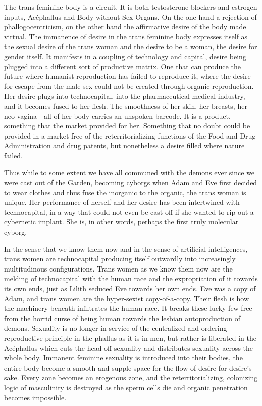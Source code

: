 \documentclass[10pt, statementpaper, twoside, openright]{memoir}
\begin{document}
The trans feminine body is a circuit. It is both testosterone blockers and estrogen inputs, Acéphallus and Body without Sex Organs. On the one hand a rejection of phallogocentricism, on the other hand the affirmative desire of the body made virtual. The immanence of desire in the trans feminine body expresses itself as the sexual desire of the trans woman and the desire to be a woman, the desire for gender itself. It manifests in a coupling of technology and capital, desire being plugged into a different sort of productive matrix. One that can produce the future where humanist reproduction has failed to reproduce it, where the desire for escape from the male sex could not be created through organic reproduction. Her desire plugs into technocapital, into the pharmaceutical-medical industry, and it becomes fused to her flesh. The smoothness of her skin, her breasts, her neo-vagina---all of her body carries an unspoken barcode. It is a product, something that the market provided for her. Something that no doubt could be provided in a market free of the reterritorializing functions of the Food and Drug Administration and drug patents, but nonetheless a desire filled where nature failed.

Thus while to some extent we have all communed with the demons ever since we were cast out of the Garden, becoming cyborgs when Adam and Eve first decided to wear clothes and thus fuse the inorganic to the organic, the trans woman is unique. Her performance of herself and her desire has been intertwined with technocapital, in a way that could not even be cast off if she wanted to rip out a cybernetic implant. She is, in other words, perhaps the first truly molecular cyborg.

In the sense that we know them now and in the sense of artificial intelligences, trans women are technocapital producing itself outwardly into increasingly multitudinous configurations. Trans women as we know them now are the melding of technocapital with the human race and the expropriation of it towards its own ends, just as Lilith seduced Eve towards her own ends. Eve was a copy of Adam, and trans women are the hyper-sexist copy-of-a-copy. Their flesh is how the machinery beneath infiltrates the human race. It breaks these lucky few free from the horrid curse of being human towards the lesbian autoproduction of demons. Sexuality is no longer in service of the centralized and ordering reproductive principle in the phallus as it is in men, but rather is liberated in the Acéphallus which cuts the head off sexuality and distributes sexuality across the whole body. Immanent feminine sexuality is introduced into their bodies, the entire body become a smooth and supple space for the flow of desire for desire's sake. Every zone becomes an erogenous zone, and the reterritorializing, colonizing logic of masculinity is destroyed as the sperm cells die and organic penetration becomes impossible.
\end{document}
